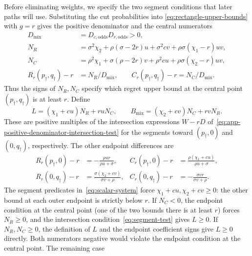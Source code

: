 \documentclass[11pt]{article}
\theoremstyle{remark}
\theoremstyle{plain}
\begin{document}
Before eliminating weights, we specify the two segment conditions
that later paths will use. Substituting the cut probabilities into
\eqref{eq:rectangle-upper-bounds} with $g=r$ gives the positive
denominator and the central numerators
\begin{equation}
 \begin{aligned}
 D_{\mathrm{mix}}&=D_{c,\mathrm{odds}}D_{r,\mathrm{odds}}>0,\\
 N_R&=\sigma^2\chi_2+\rho(\sigma-2r)u+\sigma^2cv
                         +\rho\sigma(\chi_1-r)uv,\\
 N_C&=\rho^2\chi_1+\sigma(\rho-2r)v+\rho^2cu
                         +\rho\sigma(\chi_2-r)uv,\\
 R_r(p_\dagger,q_\dagger)-r&=N_R/D_{\mathrm{mix}},\qquad
 C_r(p_\dagger,q_\dagger)-r=N_C/D_{\mathrm{mix}}.
 \end{aligned}
 \label{eq:mixing-numerators}
\end{equation}
Thus the signs of $N_R,N_C$ specify which regret upper bound at the
central point $(p_\dagger,q_\dagger)$ is at least $r$. Define
\begin{equation}
 L=(\chi_1+cu)N_R+ruN_C,\qquad
 B_{\mathrm{mix}}=(\chi_2+cv)N_C+rvN_R.
 \label{eq:mixing-determinants}
\end{equation}
These are positive multiples of the intersection expressions
$W-rD$ of~\eqref{eq:app-positive-denominator-intersection-test} for
the segments toward $(p_\dagger,0)$ and $(0,q_\dagger)$,
respectively. The other endpoint differences are
\begin{equation}
 \begin{aligned}
 R_r(p_\dagger,0)-r&=-\frac{\rho ur}{\rho u+\sigma},&
 C_r(p_\dagger,0)-r&=\frac{\rho(\chi_1+cu)}{\rho u+\sigma},\\
 R_r(0,q_\dagger)-r&=\frac{\sigma(\chi_2+cv)}{\sigma v+\rho},&
 C_r(0,q_\dagger)-r&=-\frac{\sigma vr}{\sigma v+\rho}.
 \end{aligned}
 \label{eq:mixing-outer-endpoints}
\end{equation}
The segment predicates in~\eqref{eq:scalar-system} force
$\chi_1+cu,\chi_2+cv\ge0$: the other bound at each outer endpoint
is strictly below $r$. If $N_C<0$, the endpoint condition at the
central point (one of the two bounds there is at least $r$) forces
$N_R\ge0$, and the intersection condition~\eqref{eq:segment-test} gives
$L\ge0$. If $N_R,N_C\ge0$, the definition of $L$ and the endpoint
coefficient signs give $L\ge0$ directly. Both numerators negative
would violate the endpoint condition at the central point. The remaining case
\end{document}
